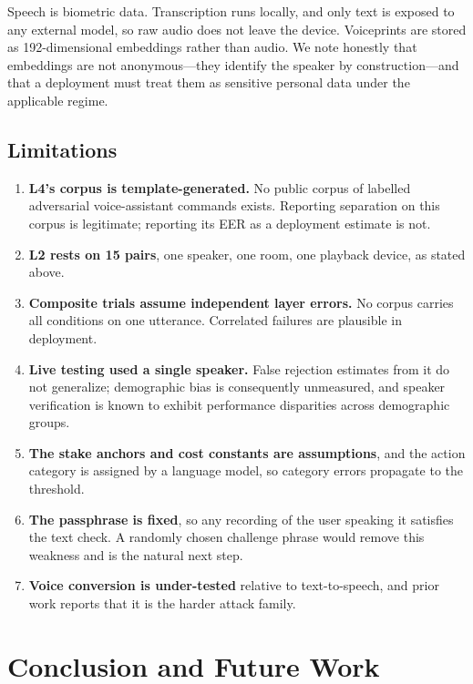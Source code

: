 \documentclass[conference]{IEEEtran}
\begin{document}
Speech is biometric data. Transcription runs locally, and only text is exposed
to any external model, so raw audio does not leave the device. Voiceprints are
stored as 192-dimensional embeddings rather than audio. We note honestly that
embeddings are not anonymous---they identify the speaker by construction---and
that a deployment must treat them as sensitive personal data under the
applicable regime.

\subsection{Limitations}

\begin{enumerate}
\item \textbf{L4's corpus is template-generated.} No public corpus of labelled
adversarial voice-assistant commands exists. Reporting separation on this
corpus is legitimate; reporting its EER as a deployment estimate is not.
\item \textbf{L2 rests on 15 pairs}, one speaker, one room, one playback
device, as stated above.
\item \textbf{Composite trials assume independent layer errors.} No corpus
carries all conditions on one utterance. Correlated failures are plausible in
deployment.
\item \textbf{Live testing used a single speaker.} False rejection estimates
from it do not generalize; demographic bias is consequently unmeasured, and
speaker verification is known to exhibit performance disparities across
demographic groups.
\item \textbf{The stake anchors and cost constants are assumptions}, and the
action category is assigned by a language model, so category errors propagate
to the threshold.
\item \textbf{The passphrase is fixed}, so any recording of the user speaking
it satisfies the text check. A randomly chosen challenge phrase would remove
this weakness and is the natural next step.
\item \textbf{Voice conversion is under-tested} relative to text-to-speech, and
prior work reports that it is the harder attack family.
\end{enumerate}

\section{Conclusion and Future Work}
\end{document}
